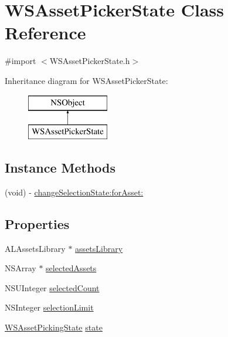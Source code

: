 \hypertarget{interface_w_s_asset_picker_state}{\section{W\-S\-Asset\-Picker\-State Class Reference}
\label{interface_w_s_asset_picker_state}
}


{\ttfamily \#import $<$W\-S\-Asset\-Picker\-State.\-h$>$}

Inheritance diagram for W\-S\-Asset\-Picker\-State\-:\begin{figure}[H]
\begin{center}
\leavevmode
\includegraphics[height=2.000000cm]{interface_w_s_asset_picker_state}
\end{center}
\end{figure}
\subsection*{Instance Methods}
\begin{DoxyCompactItemize}
\item 
(void) -\/ \hyperlink{interface_w_s_asset_picker_state_a9d5c8424095c341646b3e1e505ec2515}{change\-Selection\-State\-:for\-Asset\-:}
\end{DoxyCompactItemize}
\subsection*{Properties}
\begin{DoxyCompactItemize}
\item 
A\-L\-Assets\-Library $\ast$ \hyperlink{interface_w_s_asset_picker_state_a4595891736accd11968d244f5d9f3a62}{assets\-Library}
\item 
N\-S\-Array $\ast$ \hyperlink{interface_w_s_asset_picker_state_a8995143b1958ffa27edd11c6b7c9e90c}{selected\-Assets}
\item 
N\-S\-U\-Integer \hyperlink{interface_w_s_asset_picker_state_ab71dc1d99922c8593858abcd7c305cff}{selected\-Count}
\item 
N\-S\-Integer \hyperlink{interface_w_s_asset_picker_state_aedff54fb2330ad06352271329d8e2a35}{selection\-Limit}
\item 
\hyperlink{_w_s_asset_picker_state_8h_aec902a0f9a3395a2e6d49f2b38f51c0b}{W\-S\-Asset\-Picking\-State} \hyperlink{interface_w_s_asset_picker_state_a06ab524e5e7a0b75fa584810c7af9244}{state}
\end{DoxyCompactItemize}


